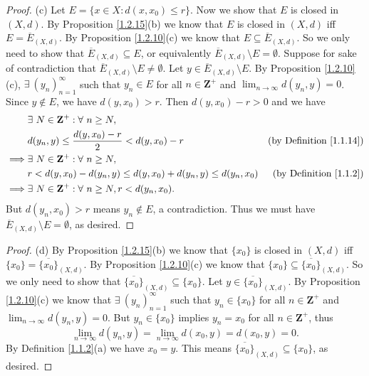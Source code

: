 \begin{proof}{(c)}
    Let \(E = \{x \in X : d(x, x_0) \leq r\}\).
    Now we show that \(E\) is closed in \((X, d)\).
    By Proposition \ref{1.2.15}(b) we know that \(E\) is closed in \((X, d)\) iff \(E = \overline{E}_{(X, d)}\).
    By Proposition \ref{1.2.10}(c) we know that \(E \subseteq \overline{E}_{(X, d)}\).
    So we only need to show that \(\overline{E}_{(X, d)} \subseteq E\), or equivalently \(\overline{E}_{(X, d)} \setminus E = \emptyset\).
    Suppose for sake of contradiction that \(\overline{E}_{(X, d)} \setminus E \neq \emptyset\).
    Let \(y \in \overline{E}_{(X, d)} \setminus E\).
    By Proposition \ref{1.2.10}(c), \(\exists\ (y_n)_{n = 1}^\infty\) such that \(y_n \in E\) for all \(n \in \mathbf{Z}^+\) and \(\lim_{n \to \infty} d(y_n, y) = 0\).
    Since \(y \notin E\), we have \(d(y, x_0) > r\).
    Then \(d(y, x_0) - r > 0\) and we have
    \begin{align*}
                 & \exists\ N \in \mathbf{Z}^+ : \forall\ n \geq N,                                                            \\
                 & d(y_n, y) \leq \frac{d(y, x_0) - r}{2} < d(y, x_0) - r                & \text{(by Definition \ref{1.1.14})} \\
        \implies & \exists\ N \in \mathbf{Z}^+ : \forall\ n \geq N,                                                            \\
                 & r < d(y, x_0) - d(y_n, y) \leq d(y, x_0) + d(y_n, y) \leq d(y_n, x_0) & \text{(by Definition \ref{1.1.2})}  \\
        \implies & \exists\ N \in \mathbf{Z}^+ : \forall\ n \geq N, r < d(y_n, x_0).
    \end{align*}
    But \(d(y_n, x_0) > r\) means \(y_n \notin E\), a contradiction.
    Thus we must have \(\overline{E}_{(X, d)} \setminus E = \emptyset\), as desired.
\end{proof}

\begin{proof}{(d)}
    By Proposition \ref{1.2.15}(b) we know that \(\{x_0\}\) is closed in \((X, d)\) iff \(\{x_0\} = \overline{\{x_0\}}_{(X, d)}\).
    By Proposition \ref{1.2.10}(c) we know that \(\{x_0\} \subseteq \overline{\{x_0\}}_{(X, d)}\).
    So we only need to show that \(\overline{\{x_0\}}_{(X, d)} \subseteq \{x_0\}\).
    Let \(y \in \overline{\{x_0\}}_{(X, d)}\).
    By Proposition \ref{1.2.10}(c) we know that \(\exists\ (y_n)_{n = 1}^\infty\) such that \(y_n \in \{x_0\}\) for all \(n \in \mathbf{Z}^+\) and \(\lim_{n \to \infty} d(y_n, y) = 0\).
    But \(y_n \in \{x_0\}\) implies \(y_n = x_0\) for all \(n \in \mathbf{Z}^+\), thus
    \[
        \lim_{n \to \infty} d(y_n, y) = \lim_{n \to \infty} d(x_0, y) = d(x_0, y) = 0.
    \]
    By Definition \ref{1.1.2}(a) we have \(x_0 = y\).
    This means \(\overline{\{x_0\}}_{(X, d)} \subseteq \{x_0\}\), as desired.
\end{proof}

